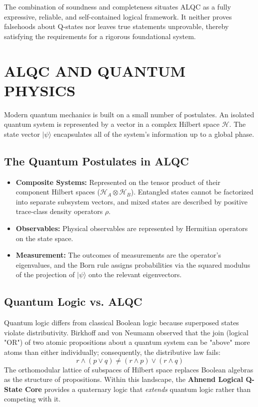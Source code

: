 \documentclass[11pt, letterpaper]{article}
\begin{document}
The combination of soundness and completeness situates ALQC as a fully expressive, reliable, and self-contained logical framework. It neither proves falsehoods about Q-states nor leaves true statements unprovable, thereby satisfying the requirements for a rigorous foundational system.


\section{ALQC AND QUANTUM PHYSICS}\label{appendixK}

Modern quantum mechanics is built on a small number of postulates. An isolated quantum system is represented by a vector in a complex Hilbert space $\mathcal{H}$. The state vector $|\psi\rangle$ encapsulates all of the system's information up to a global phase.

\subsection{The Quantum Postulates in ALQC}\label{appendixK.1}

\begin{itemize}
    \item \textbf{Composite Systems:} Represented on the tensor product of their component Hilbert spaces ($\mathcal{H}_A \otimes \mathcal{H}_B$). Entangled states cannot be factorized into separate subsystem vectors, and mixed states are described by positive trace-class density operators $\rho$.
    \item \textbf{Observables:} Physical observables are represented by Hermitian operators on the state space.
    \item \textbf{Measurement:} The outcomes of measurements are the operator's eigenvalues, and the Born rule assigns probabilities via the squared modulus of the projection of $|\psi\rangle$ onto the relevant eigenvectors.
\end{itemize}

\subsection{Quantum Logic vs. ALQC}\label{appendixK.2}

Quantum logic differs from classical Boolean logic because superposed states violate distributivity. Birkhoff and von Neumann observed that the join (logical "OR") of two atomic propositions about a quantum system can be "above" more atoms than either individually; consequently, the distributive law fails:
\[
r \land (p \lor q) \neq (r \land p) \lor (r \land q)
\]
The orthomodular lattice of subspaces of Hilbert space replaces Boolean algebras as the structure of propositions. Within this landscape, the \textbf{Ahnend Logical Q-State Core} provides a quaternary logic that \textit{extends} quantum logic rather than competing with it.
\end{document}
